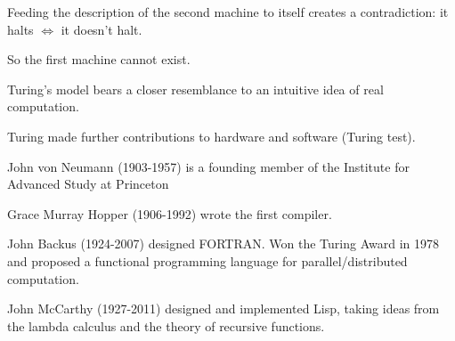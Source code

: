 \documentclass{article}
\begin{document}
Feeding the description of the second machine to itself creates a contradiction: it halts $\iff$ it doesn't halt. 

So the first machine cannot exist.

Turing's model bears a closer resemblance to an intuitive idea of real computation. 

Turing made further contributions to hardware and software (Turing test). 

John von Neumann (1903-1957) is a founding member of the Institute for Advanced Study at Princeton

Grace Murray Hopper (1906-1992) wrote the first compiler. 

John Backus (1924-2007) designed FORTRAN. Won the Turing Award in 1978 and proposed a functional programming language for parallel/distributed computation. 

John McCarthy (1927-2011) designed and implemented Lisp, taking ideas from the lambda calculus and the theory of recursive functions. 
\end{document}
